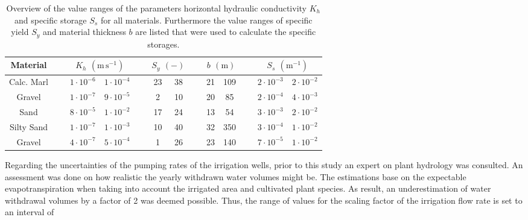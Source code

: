 \begin{table}[h]
    \label{Tab-MatPropsRange}
    \caption{Overview of the value ranges of the parameters horizontal hydraulic conductivity $K_h$ and specific storage $S_s$ for all materials. Furthermore the value ranges of specific yield $S_y$ and material thickness $b$ are listed that were used to calculate the specific storages.}
    \begin{tabular}{clcclcclcclcc}
        Material   & $\; \;$ & \multicolumn{2}{c}{$K_h$ $(\textrm{m} \, \textrm{s}^{-1})$} & $\; \;$ & \multicolumn{2}{c}{$S_y$ $(-)$} & $\; \;$ & \multicolumn{2}{c}{$b$ $(\textrm{m})$} & $\; \;$ & \multicolumn{2}{c}{$S_s$ $(\textrm{m}^{-1})$} \\ \hline
        Calc. Marl &         & $1 \cdot 10^{-6}$            & $1 \cdot 10^{-4}$            &         & 23             & 38             &         & 21                & 109                &         & $2 \cdot 10^{-3}$     & $2 \cdot 10^{-2}$     \\
        Gravel     &         & $1 \cdot 10^{-7}$            & $9 \cdot 10^{-5}$            &         & 2              & 10             &         & 20                & 85                 &         & $2 \cdot 10^{-4}$     & $4 \cdot 10^{-3}$     \\
        Sand       &         & $8 \cdot 10^{-5}$            & $1 \cdot 10^{-2}$            &         & 17             & 24             &         & 13                & 54                 &         & $3 \cdot 10^{-3}$     & $2 \cdot 10^{-2}$     \\
        Silty Sand &         & $1 \cdot 10^{-7}$            & $1 \cdot 10^{-3}$            &         & 10             & 40             &         & 32                & 350                &         & $3 \cdot 10^{-4}$     & $1 \cdot 10^{-2}$     \\
        Gravel     &         & $4 \cdot 10^{-7}$            & $5 \cdot 10^{-4}$            &         & 1              & 26             &         & 23                & 140                &         & $7 \cdot 10^{-5}$     & $1 \cdot 10^{-2}$    
    \end{tabular}
\end{table}

Regarding the uncertainties of the pumping rates of the irrigation wells, prior to this study an expert on plant hydrology was consulted. An assessment was done on how realistic the yearly withdrawn water volumes might be. The estimations base on the expectable evapotranspiration when taking into account the irrigated area and cultivated plant species. As result, an underestimation of water withdrawal volumes by a factor of 2 was deemed possible. Thus, the range of values for the scaling factor of the irrigation flow rate is set to an interval of 

